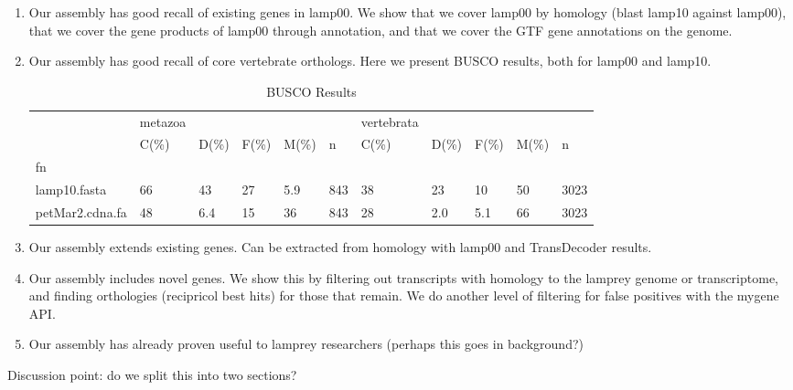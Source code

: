 \documentclass[10pt,twocolumn,linenumbers]{article}
\begin{document}
\begin{enumerate}
\item Our assembly has good recall of existing genes in lamp00. We show that we cover lamp00 by
homology (blast lamp10 against lamp00), that we cover the gene products of lamp00 through 
annotation, and that we cover the GTF gene annotations on the genome.
\item Our assembly has good recall of core vertebrate orthologs. Here we present BUSCO results, 
both for lamp00 and lamp10.



\begin{table*}[t]
\caption {BUSCO Results}
\begin{center}

\begin{tabular}{lllllllllll}
\toprule
{} & metazoa &      &      &      &      & vertebrata &      &      &
&       \\
{} &    C(\%) & D(\%) & F(\%) & M(\%) &    n &       C(\%) & D(\%) &
F(\%) & M(\%) &     n \\
\midrule
fn              &         &      &      &      &      &            &
&      &      &       \\
lamp10.fasta    &      66 &   43 &   27 &  5.9 &  843 &         38 &
23 &   10 &   50 &  3023 \\
petMar2.cdna.fa &      48 &  6.4 &   15 &   36 &  843 &         28 &
2.0 &  5.1 &   66 &  3023 \\
\bottomrule
\end{tabular}



\end{center}
\end{table*}

\item Our assembly extends existing genes. Can be extracted from homology with lamp00 and 
TransDecoder results.
\item Our assembly includes novel genes. We show this by filtering out transcripts with homology 
to the lamprey genome or transcriptome, and finding orthologies (recipricol best hits) for those 
that remain. We do another level of filtering for false positives with the mygene API.
\item Our assembly has already proven useful to lamprey researchers \citep{ren_genome-wide_2015}
(perhaps this goes in background?)
\end{enumerate}

Discussion point: do we split this into two sections?
\end{document}

